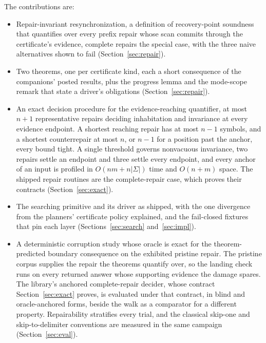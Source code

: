 \documentclass[11pt,a4paper]{article}
\theoremstyle{definition}
\theoremstyle{plain}
\theoremstyle{remark}
\begin{document}
The contributions are:
\begin{itemize}
\item Repair-invariant resynchronization, a definition of recovery-point soundness that quantifies over every prefix
repair whose scan commits through the certificate's evidence, complete repairs the special case, with the three naive
alternatives shown to fail (Section~\ref{sec:repair}).
\item Two theorems, one per certificate kind, each a short consequence of the companions' posted results, plus the
progress lemma and the mode-scope remark that state a driver's obligations (Section~\ref{sec:repair}).
\item An exact decision procedure for the evidence-reaching quantifier, at most $n + 1$ representative repairs deciding
inhabitation and invariance at every evidence endpoint. A shortest reaching repair has at most $n - 1$ symbols, and a
shortest counterrepair at most $n$, or $n - 1$ for a position past the anchor, every bound tight. A single threshold
governs nonvacuous invariance, two repairs settle an endpoint and three settle every endpoint, and every anchor of an
input is profiled in $O(nm + n|\Sigma|)$ time and $O(n + m)$ space. The shipped repair routines are the complete-repair
case, which proves their contracts (Section~\ref{sec:exact}).
\item The searching primitive and its driver as shipped, with the one divergence from the planners' certificate policy
explained, and the fail-closed fixtures that pin each layer (Sections~\ref{sec:search} and~\ref{sec:impl}).
\item A deterministic corruption study whose oracle is exact for the theorem-predicted boundary consequence on the
exhibited pristine repair. The pristine corpus supplies the repair the theorems quantify over, so the landing check runs
on every returned answer whose supporting evidence the damage spares. The library's anchored complete-repair decider,
whose contract Section~\ref{sec:exact} proves, is evaluated under that contract, in blind and oracle-anchored forms,
beside the walk as a comparator for a different property. Repairability stratifies every trial, and the classical
skip-one and skip-to-delimiter conventions are measured in the same campaign (Section~\ref{sec:eval}).
\end{itemize}
\end{document}
